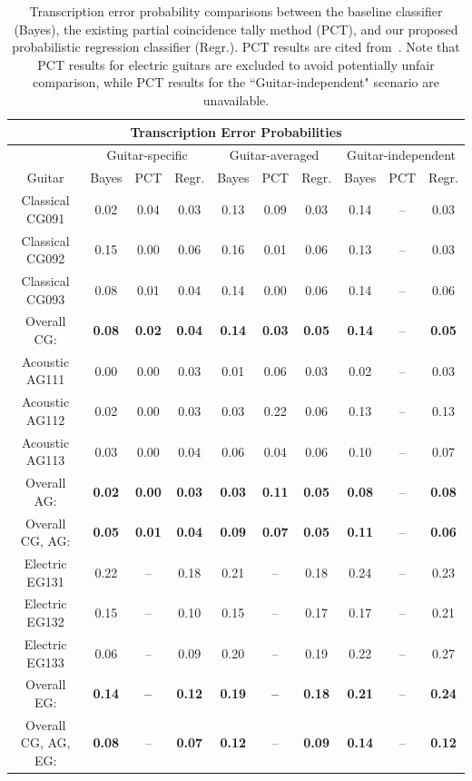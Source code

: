 \documentclass[convention,peer-reviewed]{aesconf}
\begin{document}
\begin{table}[!htbp]
\begin{center}
\begin{tabular} {||c||c|c|c||c|c|c||c|c|c||}
\hline
\multicolumn{10}{||c||}{\bf{Transcription Error Probabilities}} \\
\hline
 & \multicolumn{3}{|c||}{Guitar-specific} & \multicolumn{3}{|c||}{Guitar-averaged}& \multicolumn{3}{|c||}{Guitar-independent}\\
\hline
Guitar & Bayes & PCT & Regr. & Bayes & PCT & Regr. & Bayes & PCT & Regr.\\
\hline
\hline
Classical CG091 & 0.02 & 0.04 & 0.03 & 0.13 & 0.09 & 0.03 & 0.14 & -- & 0.03 \\
\hline
Classical CG092 & 0.15 & 0.00 & 0.06 & 0.16 & 0.01 & 0.06 & 0.13 & -- & 0.03 \\
\hline
Classical CG093 & 0.08 & 0.01 & 0.04 & 0.14 & 0.00 & 0.06 & 0.14 & -- & 0.06 \\
\hline
Overall CG: & \bf{0.08} & \bf{0.02}  & \bf{0.04} & \bf{0.14} & \bf{0.03} & \bf{0.05} & \bf{0.14} & -- & \bf{0.05}\\
\hline
\hline
Acoustic AG111 & 0.00 & 0.00 & 0.03 & 0.01 & 0.06 & 0.03 & 0.02 & -- & 0.03 \\
\hline
Acoustic AG112 & 0.02 & 0.00 & 0.03 & 0.03 & 0.22 & 0.06 & 0.13 & -- & 0.13 \\
\hline
Acoustic AG113  & 0.03 & 0.00 & 0.04 & 0.06 & 0.04 & 0.06 & 0.10 & -- & 0.07\\
\hline
Overall AG: & \bf{0.02} & \bf{0.00} & \bf{0.03} & \bf{0.03} & \bf{0.11} & \bf{0.05} & \bf{0.08} & -- & \bf{0.08}\\
\hline
\hline
\hline
Overall CG, AG: & \bf{0.05} & \bf{0.01} & \bf{0.04} & \bf{0.09} & \bf{0.07} & \bf{0.05} & \bf{0.11} & -- & \bf{0.06}\\
\hline
\hline
\hline
Electric EG131 & 0.22 & -- & 0.18 & 0.21 & -- & 0.18 & 0.24 & -- & 0.23\\
\hline
Electric EG132 & 0.15 & -- & 0.10 & 0.15 & -- & 0.17 & 0.17 & -- & 0.21\\
\hline
Electric EG133 & 0.06 & -- & 0.09 & 0.20 & --  & 0.19 & 0.22 & -- & 0.27 \\
\hline
Overall EG: & \bf{0.14} & \bf{--} & \bf{0.12} & \bf{0.19} & \bf{--} & \bf{0.18} & \bf{0.21} & -- & \bf{0.24}\\
\hline
\hline
\hline
Overall CG, AG, EG: & \bf{0.08} & -- & \bf{0.07} & \bf{0.12} & -- & \bf{0.09} & \bf{0.14} & -- & \bf{0.12}\\
\hline
\end{tabular}
\caption{Transcription error probability comparisons between the baseline classifier (Bayes), the existing partial coincidence tally method (PCT), and our proposed probabilistic regression classifier (Regr.). PCT results are cited from~\cite{barbanchoi2012}. Note that PCT results for electric guitars are excluded to avoid potentially unfair comparison, while PCT results for the ``Guitar-independent" scenario are unavailable.}
\label{tab:error-results-RWC}
\end{center}
\end{table}
\end{document}
